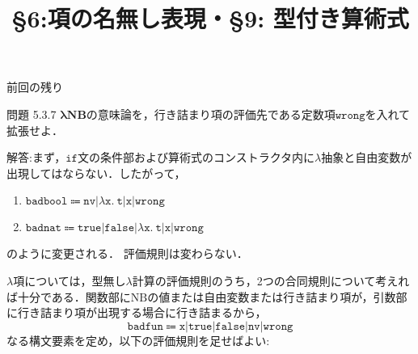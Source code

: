 \documentclass[9pt]{beamer}
\title{\S 6:項の名無し表現・\S 9: 型付き算術式}
\begin{document}
\maketitle
\begin{frame}{前回の残り}
	\begin{dblock}{問題 5.3.7}
	$\mathbf{\lambda NB}$の意味論を，行き詰まり項の評価先である定数項$\mathtt{wrong}$を入れて拡張せよ．
	\end{dblock}
\end{frame}
\begin{frame}
解答:まず，$\mathtt{if}$文の条件部および算術式のコンストラクタ内に$\mathtt{\lambda}$抽象と自由変数が出現してはならない．したがって，\begin{enumerate}\item $\mathtt{badbool \Coloneq nv|\lambda x.\ t|x|wrong}$
\item $\mathtt{badnat \Coloneq true|false|\lambda x.\ t|x|wrong}$\end{enumerate}のように変更される．
評価規則は変わらない．

$\lambda$項については，型無し$\lambda$計算の評価規則のうち，2つの合同規則について考えれば十分である．関数部に$\mathrm{NB}$の値または自由変数または行き詰まり項が，引数部に行き詰まり項が出現する場合に行き詰まるから，\begin{equation*}\mathtt{badfun\Coloneq x|true|false|nv|wrong}\end{equation*}なる構文要素を定め，以下の評価規則を足せばよい:\begin{prooftree}\end{prooftree}\begin{prooftree}\end{prooftree}
\end{frame}
\end{document}
